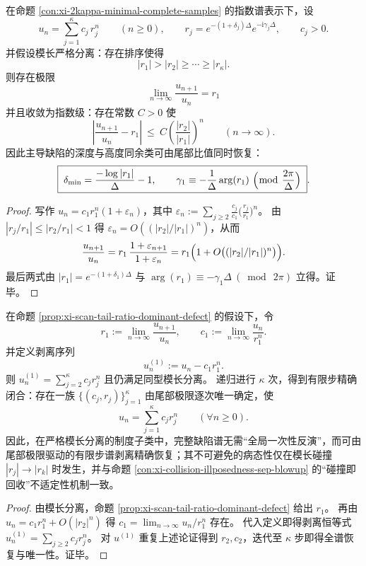 \begin{proposition}\label{prop:xi-scan-tail-ratio-dominant-defect}
在命题 \ref{con:xi-2kappa-minimal-complete-samples} 的指数谱表示下，设
\[
u_n=\sum_{j=1}^{\kappa}c_j\,r_j^{n}\qquad(n\ge 0),
\qquad
r_j=e^{-(1+\delta_j)\Delta}e^{-\mathrm{i}\gamma_j\Delta},
\qquad c_j>0.
\]
并假设模长严格分离：存在排序使得
\[
|r_1|>|r_2|\ge\cdots\ge|r_\kappa|.
\]
则存在极限
\[
\boxed{\;\lim_{n\to\infty}\frac{u_{n+1}}{u_n}=r_1\;}
\]
并且收敛为指数级：存在常数 \(C>0\) 使
\[
\left|\frac{u_{n+1}}{u_n}-r_1\right|
\ \le\ C\left(\frac{|r_2|}{|r_1|}\right)^{n}\qquad(n\to\infty).
\]
因此主导缺陷的深度与高度同余类可由尾部比值同时恢复：
\[
\boxed{\;
\delta_{\min}=\frac{-\log|r_1|}{\Delta}-1,
\qquad
\gamma_1\equiv-\frac{1}{\Delta}\arg(r_1)\ \Bigl(\bmod\ \frac{2\pi}{\Delta}\Bigr)\; }.
\]
\end{proposition}
\begin{proof}
写作 \(u_n=c_1r_1^n(1+\varepsilon_n)\)，其中
\(
\varepsilon_n:=\sum_{j\ge 2}\frac{c_j}{c_1}\bigl(\frac{r_j}{r_1}\bigr)^n
\)。
由 \(|r_j/r_1|\le |r_2/r_1|<1\) 得 \(\varepsilon_n=O((|r_2|/|r_1|)^n)\)，从而
\[
\frac{u_{n+1}}{u_n}
=r_1\,\frac{1+\varepsilon_{n+1}}{1+\varepsilon_n}
=r_1\Bigl(1+O\bigl((|r_2|/|r_1|)^n\bigr)\Bigr).
\]
最后两式由 \(|r_1|=e^{-(1+\delta_1)\Delta}\) 与 \(\arg(r_1)\equiv-\gamma_1\Delta\ (\bmod\ 2\pi)\) 立得。证毕。
\end{proof}

\begin{proposition}\label{prop:xi-scan-successive-peeling-closure}
在命题 \ref{prop:xi-scan-tail-ratio-dominant-defect} 的假设下，令
\[
r_1:=\lim_{n\to\infty}\frac{u_{n+1}}{u_n},
\qquad
c_1:=\lim_{n\to\infty}\frac{u_{n}}{r_1^{n}}.
\]
并定义剥离序列
\[
u_n^{(1)}:=u_n-c_1r_1^n.
\]
则 \(u_n^{(1)}=\sum_{j=2}^{\kappa}c_jr_j^n\) 且仍满足同型模长分离。
递归进行 \(\kappa\) 次，得到有限步精确闭合：存在一族 \(\{(c_j,r_j)\}_{j=1}^{\kappa}\) 由尾部极限逐次唯一确定，使
\[
u_n=\sum_{j=1}^{\kappa}c_jr_j^n\qquad(\forall n\ge 0).
\]
因此，在严格模长分离的制度子类中，完整缺陷谱无需“全局一次性反演”，而可由尾部极限驱动的有限步谱剥离精确恢复；其不可避免的病态性仅在模长碰撞 \(|r_j|\to|r_k|\) 时发生，并与命题 \ref{con:xi-collision-illposedness-sep-blowup} 的“碰撞即回收”不适定性机制一致。
\end{proposition}
\begin{proof}
由模长分离，命题 \ref{prop:xi-scan-tail-ratio-dominant-defect} 给出 \(r_1\)。
再由 \(u_n=c_1r_1^n+O(|r_2|^n)\) 得 \(c_1=\lim_{n\to\infty}u_n/r_1^n\) 存在。
代入定义即得剥离恒等式 \(u_n^{(1)}=\sum_{j\ge 2}c_jr_j^n\)。
对 \(u^{(1)}\) 重复上述论证得到 \(r_2,c_2\)，迭代至 \(\kappa\) 步即得全谱恢复与唯一性。证毕。
\end{proof}

\endinput

